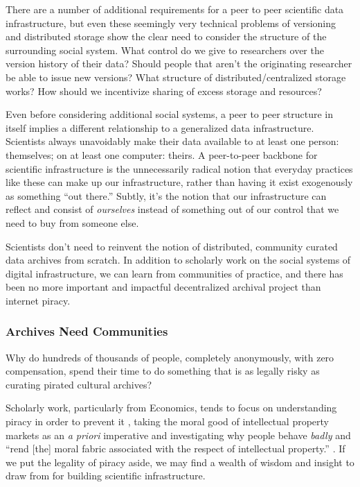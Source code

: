 \documentclass[11pt]{article}
\begin{document}
\begin{multicols}{2}
There are a number of additional requirements for a peer to peer
scientific data infrastructure, but even these seemingly very technical
problems of versioning and distributed storage show the clear need to
consider the structure of the surrounding social system. What control do
we give to researchers over the version history of their data? Should
people that aren't the originating researcher be able to issue new
versions? What structure of distributed/centralized storage works? How
should we incentivize sharing of excess storage and resources?

Even before considering additional social systems, a peer to peer
structure in itself implies a different relationship to a generalized
data infrastructure. Scientists always unavoidably make their data
available to at least one person: themselves; on at least one computer:
theirs. A peer-to-peer backbone for scientific infrastructure is the
unnecessarily radical notion that everyday practices like these can make
up our infrastructure, rather than having it exist exogenously as
something ``out there.'' Subtly, it's the notion that our infrastructure
can reflect and consist of \emph{ourselves} instead of something out of
our control that we need to buy from someone else.

Scientists don't need to reinvent the notion of distributed, community
curated data archives from scratch. In addition to scholarly work on the
social systems of digital infrastructure, we can learn from communities
of practice, and there has been no more important and impactful
decentralized archival project than internet piracy.

\hypertarget{archives-need-communities}{%
\subsubsection{Archives Need
Communities}\label{archives-need-communities}}

Why do hundreds of thousands of people, completely anonymously, with
zero compensation, spend their time to do something that is as legally
risky as curating pirated cultural archives?

Scholarly work, particularly from Economics, tends to focus on
understanding piracy in order to prevent it\cite{basamanowiczReleaseGroupsDigital2011
hindujaDeindividuationInternetSoftware2008} , taking the moral good
of intellectual property markets as an \emph{a priori} imperative and
investigating why people behave \emph{badly} and ``rend {[}the{]} moral
fabric associated with the respect of intellectual property.'' \cite{hindujaDeindividuationInternetSoftware2008} . If we put the legality
of piracy aside, we may find a wealth of wisdom and insight to draw from
for building scientific infrastructure.


\end{multicols}
\end{document}
